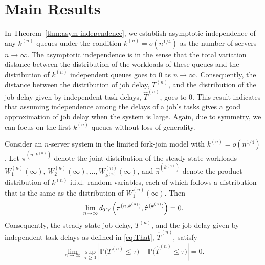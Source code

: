 \documentclass[sigconf]{acmart}
\renewcommand{\Pr}{\mathbb{P}} %
\newcommand{\supn}{^{(n)}}
\begin{document}
\section{Main Results}\label{sec:main-results}
In Theorem~\ref{thm:asym-independence}, we establish asymptotic independence of any $k\supn$ queues under the condition $k\supn = o(n^{1/4})$ as the number of servers $n\to\infty$. The asymptotic independence is in the sense that the total variation distance between the distribution of the workloads of these queues and the distribution of $k\supn$ independent queues goes to $0$ as $n\to\infty$.  Consequently, the distance between the distribution of job delay, $T\supn$, and the distribution of the job delay given by independent task delays, $\hat{T}\supn$, goes to $0$. This result indicates that assuming independence among the delays of a job's tasks gives a good approximation of job delay when the system is large.  Again, due to symmetry, we can focus on the first $k\supn$ queues without loss of generality.

\begin{theorem}\label{thm:asym-independence}
\begin{sloppypar}
Consider an $n$-server system in the limited fork-join model with $k\supn=o(n^{1/4})$. Let $\pi^{(n,k\supn)}$ denote the joint distribution of the steady-state workloads $W\supn_1(\infty)$, $W\supn_2(\infty),\dots,W\supn_{k\supn}(\infty)$, and $\hat{\pi}^{(k\supn)}$ denote the product distribution of $k\supn$ i.i.d.\ random variables, each of which follows a distribution that is the same as the distribution of $W\supn_1(\infty)$. Then
\begin{equation}\label{eq:asym-independence}
\lim_{n\to\infty}d_{TV}\Bigl(\pi^{(n,k\supn)},\hat{\pi}^{(k\supn)}\Bigr)=0.
\end{equation}
Consequently, the steady-state job delay, $T\supn$, and the job delay given by independent task delays as defined in \eqref{eq:That}, $\hat{T}\supn$, satisfy
\begin{equation}\label{eq:converge-cdf-general}
\lim_{n\to\infty}\sup_{\tau\ge 0}\left|\Pr\bigl(T\supn\le \tau\bigr)-\Pr\bigl(\hat{T}\supn\le \tau\bigr)\right|=0.
\end{equation}
\end{sloppypar}
\end{theorem}
\end{document}

